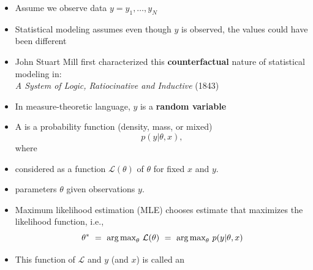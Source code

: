 \documentclass[10pt]{report}
\begin{document}


%
\begin{itemize}
\item Assume we observe data $y = y_1, \ldots, y_N$
\item Statistical modeling assumes even though $y$ is observed,
the values could have been different
\item John Stuart Mill first characterized this {\bfseries counterfactual} nature of statistical modeling in:
\\[3pt] {\slshape A System of Logic, Ratiocinative and Inductive} (1843)
\item In measure-theoretic language, $y$ is a {\bfseries random variable}
\end{itemize}


%
\begin{itemize}
\item A  is a probability function (density, mass, or mixed)
\[
p(y|\theta,x),
\]
where
\item considered as a function $\mathcal{L}(\theta)$ of $\theta$ for fixed $x$ and $y$.
\end{itemize}


%
\begin{itemize}
\item {} parameters $\theta$ given observations $y$.
\item Maximum likelihood estimation (MLE) chooses
estimate that maximizes the likelihood function, i.e.,
\[
\theta^*
\ = \ \mbox{arg\,max}_{\theta} \ \mathcal{L}(\theta)
\ = \ \mbox{arg\,max}_{\theta} \ p(y|\theta,x)
\]
\item This function of $\mathcal{L}$ and $y$ (and $x$) is called an 
\end{itemize}
\end{document}
